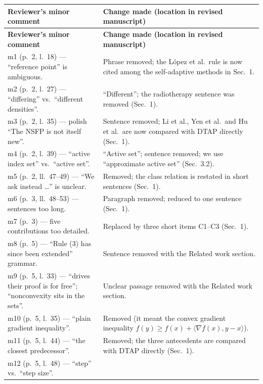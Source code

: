 \documentclass[11pt]{article}
\begin{document}
\medskip
{\footnotesize
\setlength{\tabcolsep}{5pt}
\renewcommand{\arraystretch}{1.25}
\begin{longtable}{@{}>{\raggedright\arraybackslash}p{}
                    >{\raggedright\arraybackslash}p{}@{}}
\toprule
\textbf{Reviewer's minor comment} & \textbf{Change made (location in revised manuscript)}\\
\midrule
\endfirsthead
\toprule
\textbf{Reviewer's minor comment} & \textbf{Change made (location in revised manuscript)}\\
\midrule
\endhead
\bottomrule
\endfoot
m1 (p.~2, l.~18) --- ``reference point'' is ambiguous.
  & Phrase removed; the L\'opez et al.\ rule is now cited among the self-adaptive methods in Sec.~1.\\
m2 (p.~2, l.~27) --- ``differing'' vs.\ ``different densities''.
  & ``Different''; the radiotherapy sentence was removed (Sec.~1).\\
m3 (p.~2, l.~35) --- polish ``The NSFP is not itself new''.
  & Sentence removed; Li et al., Yen et al.\ and Hu et al.\ are now compared with DTAP directly (Sec.~1).\\
m4 (p.~2, l.~39) --- ``active index set'' vs.\ ``active set''.
  & ``Active set''; sentence removed; we use ``approximate active set'' (Sec.~3.2).\\
m5 (p.~2, ll.~47--49) --- ``We ask instead \dots'' is unclear.
  & Removed; the class relation is restated in short sentences (Sec.~1).\\
m6 (p.~3, ll.~48--53) --- sentences too long.
  & Paragraph removed; reduced to one sentence (Sec.~1).\\
m7 (p.~3) --- five contributions too detailed.
  & Replaced by three short items C1--C3 (Sec.~1).\\
m8 (p.~5) --- ``Rule (3) has since been extended'' grammar.
  & Sentence removed with the Related work section.\\
m9 (p.~5, l.~33) --- ``drives their proof is for free''; ``nonconvexity sits in the sets''.
  & Unclear passage removed with the Related work section.\\
m10 (p.~5, l.~35) --- ``plain gradient inequality''.
  & Removed (it meant the convex gradient inequality $f(y)\ge f(x)+\langle\nabla f(x),y-x\rangle$).\\
m11 (p.~5, l.~44) --- ``the closest predecessor''.
  & Removed; the three antecedents are compared with DTAP directly (Sec.~1).\\
m12 (p.~5, l.~48) --- ``step'' vs.\ ``step size''.

\end{longtable}}
\end{document}
